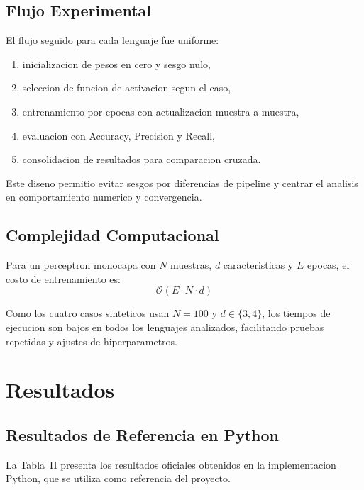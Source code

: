 \documentclass[10pt,twocolumn,a4paper]{article}
\begin{document}
\subsection{Flujo Experimental}

El flujo seguido para cada lenguaje fue uniforme:
\begin{enumerate}
  \item inicializacion de pesos en cero y sesgo nulo,
  \item seleccion de funcion de activacion segun el caso,
  \item entrenamiento por epocas con actualizacion muestra a muestra,
  \item evaluacion con Accuracy, Precision y Recall,
  \item consolidacion de resultados para comparacion cruzada.
\end{enumerate}

Este diseno permitio evitar sesgos por diferencias de pipeline y
centrar el analisis en comportamiento numerico y convergencia.

\subsection{Complejidad Computacional}

Para un perceptron monocapa con $N$ muestras, $d$ caracteristicas y
$E$ epocas, el costo de entrenamiento es:
\begin{equation}
  \mathcal{O}(E\cdot N\cdot d)
\end{equation}

Como los cuatro casos sinteticos usan $N=100$ y $d\in\{3,4\}$, los
tiempos de ejecucion son bajos en todos los lenguajes analizados,
facilitando pruebas repetidas y ajustes de hiperparametros.

\section{Resultados}

\subsection{Resultados de Referencia en Python}

La Tabla~II presenta los resultados oficiales obtenidos en la
implementacion Python, que se utiliza como referencia del proyecto.
\end{document}
